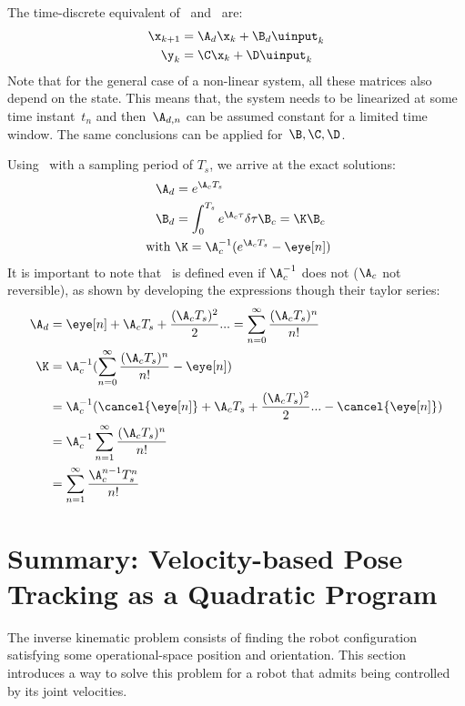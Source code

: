 The time-discrete equivalent of~ and~ are:
\begin{align}
  \x_{k+1} &= \A_d\x_k + \B_d\uinput_k \\
  \y_k &= \C\x_k + \D\uinput_k
\end{align}
Note that for the general case of a non-linear system, all these matrices also
depend on the state. This means that, the system needs to be linearized at some
time instant~${t_n}$ and then~${\A_{d,n}}$ can be assumed constant for a limited
time window. The same conclusions can be applied for~${\B, \C, \D}$.


Using~ with a sampling period of $T_s$, we arrive at the
exact solutions:
\begin{align}
  \A_d &= e^{\A_cT_s} \\
  \B_d &= \int_{0}^{T_s}e^{\A_c\tau}\delta\tau\B_c = \K \B_c \label{eqn:ss_bdiscrete} \\
  \text{ with } & \K = \A_c^{-1}(e^{\A_cT_s} - \eye[ n ])
\end{align}
It is important to note that~ is defined even if
$\A_c^{-1}$ does not ($\A_c$ not reversible), as shown by developing the expressions
though their taylor series:
\begin{align}
  \A_d &= \eye[ n ] + \A_c T_s + \frac{(\A_c T_s)^2}{2} ... = \sum^{\infty}_{n=0} \frac{(\A_c T_s)^n}{n!} \\
  \K &= \A_c^{-1}(\sum^{\infty}_{n=0} \frac{(\A_c T_s)^n}{n!}  - \eye[ n ]) \\
       &= \A_c^{-1}(\cancel{\eye[ n ]} + \A_c T_s + \frac{(\A_c T_s)^2}{2} ...  - \cancel{\eye[ n ]}) \\
       &= \A_c^{-1}\sum^{\infty}_{n=1} \frac{(\A_c T_s)^n}{n!} \\
       &= \sum^{\infty}_{n=1} \frac{\A_c^{n-1} T_s^n}{n!}
\end{align}


\chapter{Summary: Velocity-based Pose Tracking as a Quadratic Program}
\label{sec:ik_solver}

The inverse kinematic problem consists of finding the robot configuration
satisfying some operational-space position and orientation. This section
introduces a way to solve this problem for a robot that admits being controlled
by its joint velocities.


